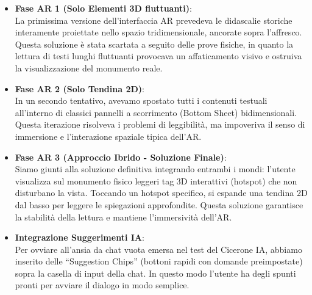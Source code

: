 \begin{itemize}[leftmargin=1.5em]
    \item \textbf{Fase AR 1 (Solo Elementi 3D fluttuanti)}:\\
    La primissima versione dell'interfaccia AR prevedeva le didascalie storiche interamente proiettate nello spazio tridimensionale, ancorate sopra l'affresco. Questa soluzione è stata scartata a seguito delle prove fisiche, in quanto la lettura di testi lunghi fluttuanti provocava un affaticamento visivo e ostruiva la visualizzazione del monumento reale.
    
    \item \textbf{Fase AR 2 (Solo Tendina 2D)}:\\
    In un secondo tentativo, avevamo spostato tutti i contenuti testuali all'interno di classici pannelli a scorrimento (Bottom Sheet) bidimensionali. Questa iterazione risolveva i problemi di leggibilità, ma impoveriva il senso di immersione e l'interazione spaziale tipica dell'AR.
    
    \item \textbf{Fase AR 3 (Approccio Ibrido - Soluzione Finale)}:\\
    Siamo giunti alla soluzione definitiva integrando entrambi i mondi: l'utente visualizza sul monumento fisico leggeri tag 3D interattivi (hotspot) che non disturbano la vista. Toccando un hotspot specifico, si espande una tendina 2D dal basso per leggere le spiegazioni approfondite. Questa soluzione garantisce la stabilità della lettura e mantiene l'immersività dell'AR.
    
    \item \textbf{Integrazione Suggerimenti IA}:\\
    Per ovviare all'ansia da chat vuota emersa nel test del Cicerone IA, abbiamo inserito delle ``Suggestion Chips'' (bottoni rapidi con domande preimpostate) sopra la casella di input della chat. In questo modo l'utente ha degli spunti pronti per avviare il dialogo in modo semplice.
\end{itemize}

